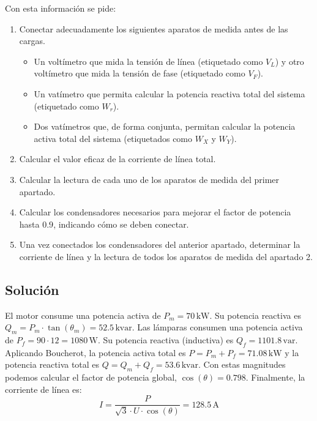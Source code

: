 Con esta información se pide:
\begin{enumerate}
\item Conectar adecuadamente los siguientes aparatos de medida antes
  de las cargas.
  \begin{itemize}
  \item Un voltímetro que mida la tensión de línea (etiquetado como
    $V_L$) y otro voltímetro que mida la tensión de fase (etiquetado
    como $V_F$).
  \item Un vatímetro que permita calcular la potencia reactiva total
    del sistema (etiquetado como $W_r$).
  \item Dos vatímetros que, de forma conjunta, permitan calcular la
    potencia activa total del sistema (etiquetados como $W_X$ y
    $W_Y$).
  \end{itemize}
\item Calcular el valor eficaz de la corriente de línea
  total.
\item Calcular la lectura de cada uno de los aparatos
  de medida del primer apartado.
\item Calcular los condensadores necesarios para
  mejorar el factor de potencia hasta $0.9$, indicando cómo se deben
  conectar.
\item Una vez conectados los condensadores del anterior
  apartado, determinar la corriente de línea y la lectura de todos los
  aparatos de medida del apartado 2.
\end{enumerate}

\subsection*{Solución}

El motor consume una potencia activa de $P_m = 70\,\mathrm{kW}$. Su
potencia reactiva es
$Q_m = P_m \cdot \tan(\theta_m) = 52.5\,\mathrm{kvar}$.  Las lámparas
consumen una potencia activa de $P_f = 90 \cdot 12 =
1080\,\mathrm{W}$. Su potencia reactiva (inductiva) es
$Q_f = 1101.8\,\mathrm{var}$.  Aplicando Boucherot, la potencia activa
total es $P = P_m + P_f = 71.08\,\mathrm{kW}$ y la potencia reactiva
total es $Q = Q_m + Q_f = 53.6\,\mathrm{kvar}$. Con estas magnitudes
podemos calcular el factor de potencia global, $\cos(\theta) =
0.798$. Finalmente, la corriente de línea es:
\[
  I = \frac{P}{\sqrt3 \cdot U \cdot \cos(\theta)} = 128.5\,\mathrm{A}
\]


